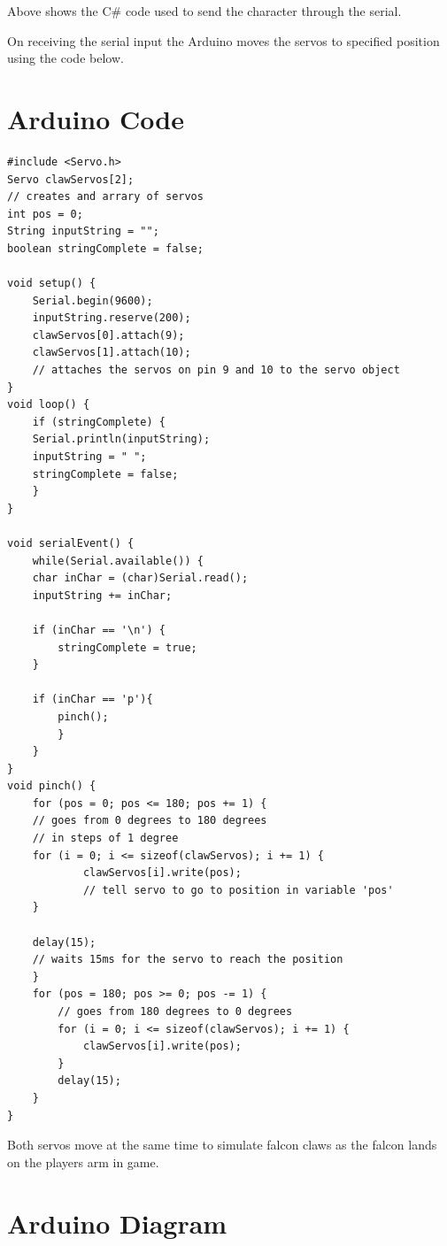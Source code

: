 \documentclass{scrartcl}
\begin{document}
Above shows the C\# code used to send the character through the serial.

On receiving the serial input the Arduino moves the servos to specified position using the code below.

\section{Arduino Code}
\begin{lstlisting}
#include <Servo.h>
Servo clawServos[2];  
// creates and arrary of servos 
int pos = 0; 
String inputString = "";
boolean stringComplete = false;

void setup() {
	Serial.begin(9600);
	inputString.reserve(200);
	clawServos[0].attach(9);
	clawServos[1].attach(10);
	// attaches the servos on pin 9 and 10 to the servo object   
}
void loop() {
	if (stringComplete) {
	Serial.println(inputString);
	inputString = " ";
	stringComplete = false;
	}
}

void serialEvent() {
	while(Serial.available()) {
	char inChar = (char)Serial.read();
	inputString += inChar;
	
	if (inChar == '\n') {
		stringComplete = true;
	}
	
	if (inChar == 'p'){
		pinch();
		}
	}
}
void pinch() {
	for (pos = 0; pos <= 180; pos += 1) {
	// goes from 0 degrees to 180 degrees
	// in steps of 1 degree
	for (i = 0; i <= sizeof(clawServos); i += 1) {
			clawServos[i].write(pos);  
			// tell servo to go to position in variable 'pos'
	}
      
	delay(15);                       
	// waits 15ms for the servo to reach the position
	}
	for (pos = 180; pos >= 0; pos -= 1) { 
		// goes from 180 degrees to 0 degrees
		for (i = 0; i <= sizeof(clawServos); i += 1) {
			clawServos[i].write(pos); 
		}
		delay(15);
	}
}

\end{lstlisting}

Both servos move at the same time to simulate falcon claws as the falcon lands on the players arm in game.

\newpage
\section{Arduino Diagram}
\end{document}

